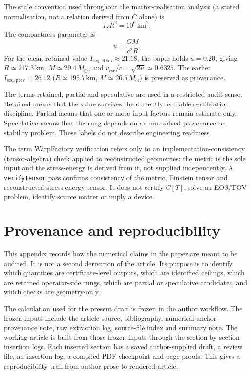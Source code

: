 \documentclass[11pt,a4paper]{article}
\begin{document}
The scale convention used throughout the matter-realisation analysis (a stated normalisation, not a relation derived from $C$ alone) is
\[
I_{S}R^{2}=10^{6}\,\mathrm{km}^{2}.
\]
The compactness parameter is
\[
u=\frac{GM}{c^{2}R}.
\]
For the clean retained value $I_{\mathrm{seq,clean}}\approx21.18$, the paper holds $u=0.20$, giving $R\simeq217.3\,\mathrm{km}$, $M\simeq29.4\,M_{\odot}$, and $v_{\mathrm{esc}}/c=\sqrt{2u}\simeq0.6325$. The earlier $I_{\mathrm{seq,prov}}=26.12$ ($R\simeq195.7\,\mathrm{km}$, $M\simeq26.5\,M_{\odot}$) is preserved as provenance.

The terms retained, partial and speculative are used in a restricted audit sense. Retained means that the value survives the currently available certification discipline. Partial means that one or more input factors remain estimate-only. Speculative means that the rung depends on an unresolved provenance or stability problem. These labels do not describe engineering readiness.

The term WarpFactory verification refers only to an implementation-consistency (tensor-algebra) check applied to reconstructed geometries: the metric is the sole input and the stress-energy is derived from it, not supplied independently. A \texttt{verifyTensor} pass confirms consistency of the metric, Einstein tensor and reconstructed stress-energy tensor. It does not certify $C[T]$, solve an EOS/TOV problem, identify source matter or imply a device.



\section{Provenance and reproducibility}\label{app:provenance}

This appendix records how the numerical claims in the paper are meant to be audited. It is not a second derivation of the article. Its purpose is to identify which quantities are certificate-level outputs, which are identified ceilings, which are retained operator-side rungs, which are partial or speculative candidates, and which checks are geometry-only.

The calculation used for the present draft is frozen in the author workflow. The frozen inputs include the article source, bibliography, numerical-anchor provenance note, raw extraction log, source-file index and summary note. The working article is built from those frozen inputs through the section-by-section insertion logs. Each inserted section has a saved author-supplied draft, a review file, an insertion log, a compiled PDF checkpoint and page proofs. This gives a reproducibility trail from author prose to rendered article.
\end{document}
